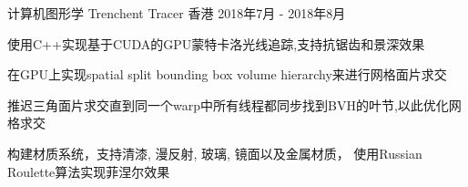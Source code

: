 \cventry
{计算机图形学} %
{Trenchent Tracer} %
{香港} %
{2018年7月 - 2018年8月} %
{ %
\begin{cvitems}
    \item {使用C++实现基于CUDA的GPU蒙特卡洛光线追踪,支持抗锯齿和景深效果}
    \item {在GPU上实现spatial split bounding box volume hierarchy来进行网格面片求交}
    \item {推迟三角面片求交直到同一个warp中所有线程都同步找到BVH的叶节,以此优化网格求交}
    \item {构建材质系统，支持清漆, 漫反射, 玻璃, 镜面以及金属材质， 使用Russian Roulette算法实现菲涅尔效果}
\end{cvitems}
}